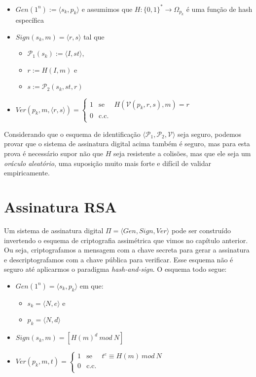 \begin{itemize}
\item $Gen(1^n) := \langle s_k, p_k \rangle$ e assumimos que $H: \{0,1\}^* \to \Omega_{p_k}$ é uma função de hash específica
\item $Sign(s_k, m) = \langle r, s \rangle$ tal que
\begin{itemize}
\item $\mathcal{P}_1(s_k) := \langle I, st \rangle$,
\item $r := H(I, m)$ e
\item $s := \mathcal{P}_2(s_k, st, r)$
\end{itemize}
\item $Ver(p_k, m, \langle r, s \rangle) = \left\{
    \begin{array}{lcl}
      1 & \textrm{se} & H(\mathcal{V}(p_k, r, s), m) = r\\
      0 & \textrm{c.c.} &\\
    \end{array}
    \right.$
\end{itemize}

Considerando que o esquema de identificação $\langle \mathcal{P}_1, \mathcal{P}_2, \mathcal{V} \rangle$ seja seguro, podemos provar que o sistema de assinatura digital acima também é seguro, mas para esta prova é necessário supor não que $H$ seja resistente a colisões, mas que ele seja um {\em oráculo aleatório}, uma suposição muito mais forte e difícil de validar empiricamente.


\section{Assinatura RSA}
\label{sec:assinatura-rsa}

Um sistema de assinatura digital $\Pi = \langle Gen, Sign, Ver \rangle$ pode ser construído invertendo o esquema de criptografia assimétrica que vimos no capítulo anterior.
Ou seja, criptografamos a mensagem com a chave secreta para gerar a assinatura e descriptografamos com a chave pública para verificar.
Esse esquema não é seguro até aplicarmos o paradigma {\em hash-and-sign}.
O esquema todo segue:
\begin{itemize}
\item $Gen(1^n) = \langle s_k, p_k \rangle$ em que:
\begin{itemize}
\item $s_k = \langle N, e \rangle$ e
\item $p_k = \langle N, d \rangle$
\end{itemize}
\item $Sign(s_k, m) = [H(m)^d\ mod\ N]$
\item $Ver(p_k, m, t) = \left\{
    \begin{array}{lcl}
      1 & \textrm{se} & t^e \equiv H(m)\ mod\ N\\
      0 & \textrm{c.c.} &\\
    \end{array}
    \right.$
\end{itemize}

